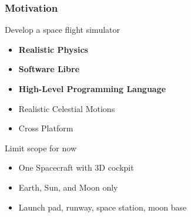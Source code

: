 \documentclass[aspectratio=169,11pt,xcolor=dvipsnames]{beamer}
\begin{document}
\begin{frame}
  \frametitle{Motivation}
  \begin{minipage}[t]{0.49\textwidth}
    Develop a space flight simulator
    \begin{itemize}
      \item \textbf{Realistic Physics}
      \item \textbf{Software Libre}
      \item \textbf{High-Level Programming Language}
      \item Realistic Celestial Motions
      \item Cross Platform
    \end{itemize}
  \end{minipage}
  \begin{minipage}[t]{0.49\textwidth}
    Limit scope for now
    \begin{itemize}
      \item One Spacecraft with 3D cockpit
      \item Earth, Sun, and Moon only
      \item Launch pad, runway, space station, moon base
    \end{itemize}
  \end{minipage}
\end{frame}
\end{document}
